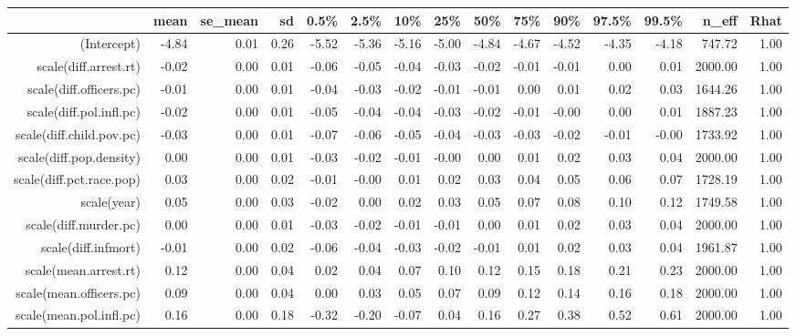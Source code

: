 \begin{table}[ht]
\centering
\begin{tabular}{rrrrrrrrrrrrrrr}
  \hline
 & mean & se\_mean & sd & 0.5\% & 2.5\% & 10\% & 25\% & 50\% & 75\% & 90\% & 97.5\% & 99.5\% & n\_eff & Rhat \\ 
  \hline
(Intercept) & -4.84 & 0.01 & 0.26 & -5.52 & -5.36 & -5.16 & -5.00 & -4.84 & -4.67 & -4.52 & -4.35 & -4.18 & 747.72 & 1.00 \\ 
  scale(diff.arrest.rt) & -0.02 & 0.00 & 0.01 & -0.06 & -0.05 & -0.04 & -0.03 & -0.02 & -0.01 & -0.01 & 0.00 & 0.01 & 2000.00 & 1.00 \\ 
  scale(diff.officers.pc) & -0.01 & 0.00 & 0.01 & -0.04 & -0.03 & -0.02 & -0.01 & -0.01 & 0.00 & 0.01 & 0.02 & 0.03 & 1644.26 & 1.00 \\ 
  scale(diff.pol.infl.pc) & -0.02 & 0.00 & 0.01 & -0.05 & -0.04 & -0.04 & -0.03 & -0.02 & -0.01 & -0.00 & 0.00 & 0.01 & 1887.23 & 1.00 \\ 
  scale(diff.child.pov.pc) & -0.03 & 0.00 & 0.01 & -0.07 & -0.06 & -0.05 & -0.04 & -0.03 & -0.03 & -0.02 & -0.01 & -0.00 & 1733.92 & 1.00 \\ 
  scale(diff.pop.density) & 0.00 & 0.00 & 0.01 & -0.03 & -0.02 & -0.01 & -0.00 & 0.00 & 0.01 & 0.02 & 0.03 & 0.04 & 2000.00 & 1.00 \\ 
  scale(diff.pct.race.pop) & 0.03 & 0.00 & 0.02 & -0.01 & -0.00 & 0.01 & 0.02 & 0.03 & 0.04 & 0.05 & 0.06 & 0.07 & 1728.19 & 1.00 \\ 
  scale(year) & 0.05 & 0.00 & 0.03 & -0.02 & 0.00 & 0.02 & 0.03 & 0.05 & 0.07 & 0.08 & 0.10 & 0.12 & 1749.58 & 1.00 \\ 
  scale(diff.murder.pc) & 0.00 & 0.00 & 0.01 & -0.03 & -0.02 & -0.01 & -0.01 & 0.00 & 0.01 & 0.02 & 0.03 & 0.04 & 2000.00 & 1.00 \\ 
  scale(diff.infmort) & -0.01 & 0.00 & 0.02 & -0.06 & -0.04 & -0.03 & -0.02 & -0.01 & 0.01 & 0.02 & 0.03 & 0.04 & 1961.87 & 1.00 \\ 
  scale(mean.arrest.rt) & 0.12 & 0.00 & 0.04 & 0.02 & 0.04 & 0.07 & 0.10 & 0.12 & 0.15 & 0.18 & 0.21 & 0.23 & 2000.00 & 1.00 \\ 
  scale(mean.officers.pc) & 0.09 & 0.00 & 0.04 & 0.00 & 0.03 & 0.05 & 0.07 & 0.09 & 0.12 & 0.14 & 0.16 & 0.18 & 2000.00 & 1.00 \\ 
  scale(mean.pol.infl.pc) & 0.16 & 0.00 & 0.18 & -0.32 & -0.20 & -0.07 & 0.04 & 0.16 & 0.27 & 0.38 & 0.52 & 0.61 & 2000.00 & 1.00 \\ 

\end{tabular}
\end{table}
